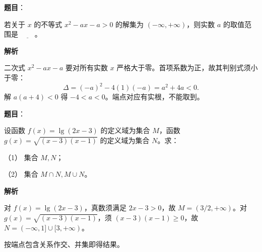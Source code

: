 \begin{answer}

\textbf{题目}：

若关于 $x$ 的不等式 $x^2-ax-a>0$ 的解集为 $(-\infty,+\infty)$，则实数 $a$ 的取值范围是 $\underline{\qquad}$。

\textbf{解析}

二次式 $x^2-ax-a$ 要对所有实数 $x$ 严格大于零。首项系数为正，故其判别式须小于零：
\nopagebreak[4]
\[
\Delta=(-a)^2-4(1)(-a)=a^2+4a<0.
\]
解 $a(a+4)<0$ 得 $-4<a<0$。端点对应有实根，不能取到。


\end{answer}

\begin{answer}

\textbf{题目}：

设函数 $f(x)=\lg(2x-3)$ 的定义域为集合 $M$，函数 $g(x)=\sqrt{(x-3)(x-1)}$ 的定义域为集合 $N$。求：

（1） 集合 $M,N$；

（2） 集合 $M\cap N,M\cup N$。

\textbf{解析}


对 $f(x)=\lg(2x-3)$，真数须满足 $2x-3>0$，故 $M=(3/2,+\infty)$。对 $g(x)=\sqrt{(x-3)(x-1)}$，须 $(x-3)(x-1)\ge0$，故 $N=(-\infty,1]\cup[3,+\infty)$。


按端点包含关系作交、并集即得结果。

\gkanswer{答案（1）：$M=(\frac32,+\infty)$，$N=(-\infty,1]\cup[3,+\infty)$}


\end{answer}
